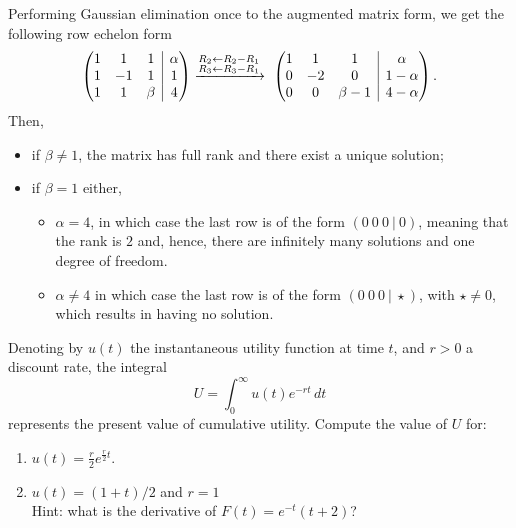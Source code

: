 \documentclass[11pt]{exam}
\newcommand{\BAR}{%
    \hspace{-\arraycolsep}%
    \strut\vrule %
    \hspace{-\arraycolsep}%
}
\begin{document}
\begin{questions}
\begin{solution}[0cm]
    Performing Gaussian elimination once to the augmented matrix form, we get the following row echelon form
    \[
    \begin{pmatrix}
    1 & 1 & 1 & \BAR & \alpha \\
    1 & -1 & 1 & \BAR & 1 \\
    1 & 1 & \beta & \BAR & 4
    \end{pmatrix}
    \xrightarrow{\substack{R_2\leftarrow R_2-R_1 \\ R_3\leftarrow R_3-R_1}}\
    \begin{pmatrix}
    1 & 1 & 1 & \BAR & \alpha \\
    0 & -2 & 0 & \BAR & 1-\alpha \\
    0 & 0 & \beta-1 & \BAR & 4-\alpha
    \end{pmatrix}.
    \]
    Then, 
    \begin{itemize}
    \item[$\bullet$] if $\beta \neq 1$, the matrix has full rank and there exist a unique solution; 
    \item[$\bullet$] if $\beta = 1$ either,
    \begin{itemize}
        \item[$*$] $\alpha = 4$, in which case the last row is of the form $(0\ 0\ 0\ |\ 0)$, meaning that the rank is $2$ and, hence, there are infinitely many solutions and one degree of freedom.
        \item[$*$] $\alpha \neq 4$ in which case the last row is of the form $(0\ 0\ 0\ |\ \star)$, with $\star \neq 0$, which results in having no solution.
    \end{itemize}
    \end{itemize}
\end{solution}

\question[2]
    Denoting by \( u(t) \) the instantaneous utility function at time $t$, and \( r > 0 \) a discount rate, the integral
    \[
    U = \int_{0}^{\infty} u(t) e^{-rt} \, dt
    \]
    represents the present value of cumulative utility. Compute the value of $U$ for:
    
    \begin{enumerate}[leftmargin = 0.5cm, label = (\alph*), rightmargin = 0.2cm]

        \item $u(t) = \frac{r}{2}e^{\frac{r}{2}t}$.
        
        \item $u(t) = (1 + t)/2$ and $r = 1$\\
        Hint: what is the derivative of $F(t) = e^{-t}(t+2)$?
        

\end{enumerate}
\end{questions}
\end{document}
